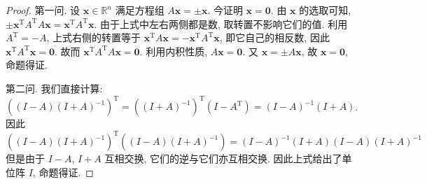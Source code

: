 \documentclass[UTF8]{ctexart}
\begin{document}
\begin{proof}
  第一问.
  设 \(\boldsymbol{x} \in \mathbb{R}^{n}\) 满足方程组 \(A\boldsymbol{x} = \pm\boldsymbol{x}\). 今证明 \(\boldsymbol{x} = \boldsymbol{0}\).
  由 \(\boldsymbol{x}\) 的选取可知, \(\pm\boldsymbol{x}^{\mathrm{T}}A^{\mathrm{T}}A\boldsymbol{x} = \boldsymbol{x}^{\mathrm{T}}A^{\mathrm{T}}\boldsymbol{x}\).
  由于上式中左右两侧都是数, 取转置不影响它们的值. 利用 \(A^{\mathrm{T}}=-A\),
  上式右侧的转置等于 \(\boldsymbol{x}^{\mathrm{T}}A\boldsymbol{x} = -\boldsymbol{x}^{\mathrm{T}}A^{\mathrm{T}}\boldsymbol{x}\), 即它自己的相反数, 因此 \(\boldsymbol{x}^{\mathrm{T}}A^{\mathrm{T}}\boldsymbol{x}=\boldsymbol{0}\).
  故而 \(\boldsymbol{x}^{\mathrm{T}}A^{\mathrm{T}}A\boldsymbol{x}=\boldsymbol{0}\). 利用内积性质, \(A\boldsymbol{x} = \boldsymbol{0}\). 又 \(\boldsymbol{x} = \pm A\boldsymbol{x}\),
  故 \(\boldsymbol{x} = \boldsymbol{0}\), 命题得证.

  第二问. 我们直接计算:
  \(((I-A)(I+A)^{-1})^{\mathrm{T}}=((I+A)^{-1})^{\mathrm{T}}(I-A^{\mathrm{T}})=(I-A)^{-1}(I+A)\).
  因此 \(((I-A)(I+A)^{-1})^{\mathrm{T}}((I-A)(I+A)^{-1})=(I-A)^{-1}(I+A)(I-A)(I+A)^{-1}\)
  但是由于 \(I-A\), \(I+A\) 互相交换, 它们的逆与它们亦互相交换. 因此上式给出了单位阵 \(I\),
  命题得证.
\end{proof}
\end{document}
